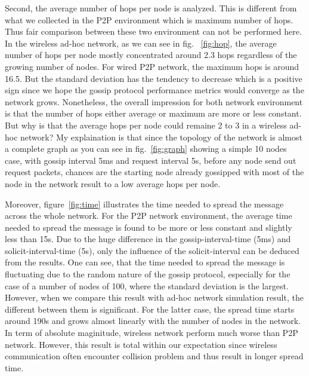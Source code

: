 Second, the average number of hops per node is analyzed. This is different from what we collected in the P2P environment which is maximum number of hops. Thus fair comparison between these two environment can not be performed here. In the wireless ad-hoc network, as we can see in fig. ~\ref{fig:hop}, the average number of hops per node mostly concentrated around 2.3 hops regardless of the growing number of nodes. For wired P2P network, the maximum hops is around 16.5. But the standard deviation has the tendency to decrease which is a positive sign since we hope the gossip protocol performance metrics would converge as the network grows. Nonetheless, the overall impression for both network environment is that the number of hops either average or maximum are more or less constant. But why is that the average hops per node could remaine 2 to 3 in a wireless ad-hoc network? My explaination is that since the topology of the network is almost a complete graph as you can see in fig.~\ref{fig:graph} showing a simple 10 nodes case, with gossip interval 5ms and request interval 5s, before any node send out request packets, chances are the starting node already gossipped with most of the node in the network result to a low average hops per node.

%
%

Moreover, figure~\ref{fig:time} illustrates the time needed to spread the message across the whole network. For the P2P network environment, the average time needed to spread the message is found to be more or less constant and slightly less than 15s. Due to the huge difference in the gossip-interval-time (5ms) and solicit-interval-time (5s), only the influence of the solicit-interval can be deduced from the results. One can see, that the time needed to spread the message is fluctuating due to the random nature of the gossip protocol, especially for the case of a number of nodes of 100, where the standard deviation is the largest. However, when we compare this result with ad-hoc network simulation result, the different between them is significant. For the latter case, the spread time starts around 190s and grows almost linearly with the number of nodes in the network. In term of absolute maginitude, wireless network perform much worse than P2P network. However, this result is total within our expectation since wireless communication often encounter collision problem and thus result in longer spread time.

